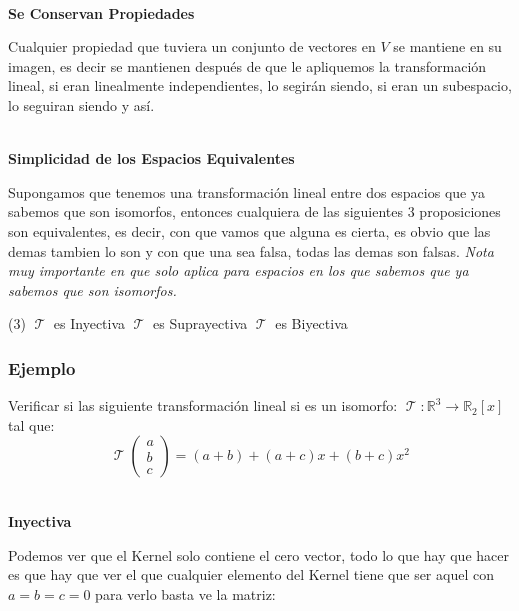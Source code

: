 \documentclass[12pt]{report}                                    %
\DeclareMathOperator \LinealTransformation {\mathcal{T}}
\begin{document}
            \textbf{\\Se Conservan Propiedades}

            Cualquier propiedad que tuviera un conjunto de vectores en $V$ se mantiene
            en su imagen, es decir se mantienen después de que le apliquemos la
            transformación lineal, si eran linealmente independientes, lo segirán siendo,
            si eran un subespacio, lo seguiran siendo y así.

            \textbf{\\Simplicidad de los Espacios Equivalentes}

            Supongamos que tenemos una transformación lineal entre dos espacios que ya
            sabemos que son isomorfos, entonces cualquiera de las siguientes 3 proposiciones
            son equivalentes, es decir, con que vamos que alguna es cierta, es obvio que las
            demas tambien lo son y con que una sea falsa, todas las demas son falsas.
            \emph{Nota muy importante en que solo aplica para espacios en los que sabemos que ya sabemos que son isomorfos.}

            \begin{tasks}(3)
                \task $\LinealTransformation$ es Inyectiva
                \task $\LinealTransformation$ es Suprayectiva
                \task $\LinealTransformation$ es Biyectiva
            \end{tasks}



            \clearpage
            \subsubsection{Ejemplo}
            Verificar si las siguiente transformación lineal si es un isomorfo:
            $\LinealTransformation : \mathbb{R}^3 \to \mathbb{R}_2[x]$ tal que: 
            \begin{equation*}
            \LinealTransformation(\begin{matrix}a\\b\\c\end{matrix}) = (a+b)+(a+c)x+(b+c)x^2
            \end{equation*}


            \textbf{\\Inyectiva}

            Podemos ver que el Kernel solo contiene el cero vector, todo lo que hay que hacer es
            que hay que ver el que cualquier elemento del Kernel tiene que ser aquel con $a=b=c=0$
            para verlo basta ve la matriz:
\end{document}
